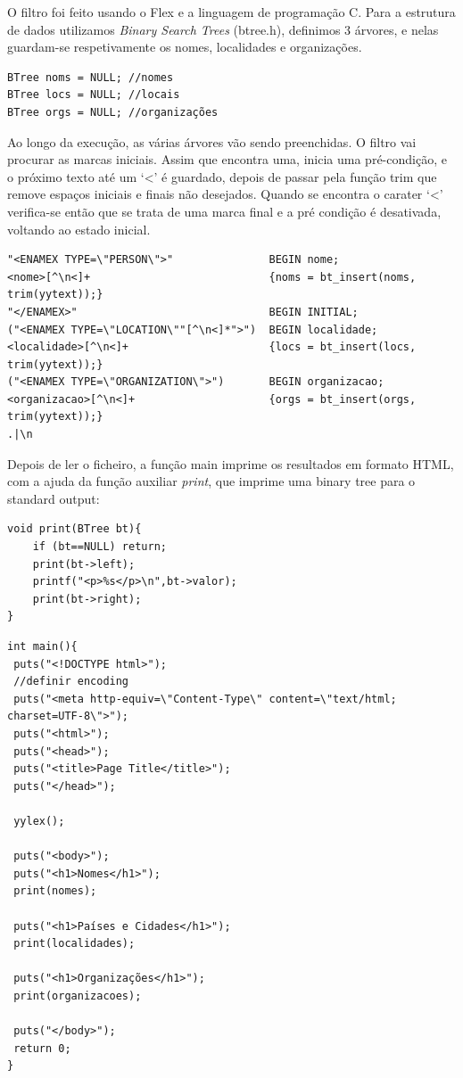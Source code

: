 \documentclass[11pt,a4paper]{article}
\begin{document}
O filtro foi feito usando o Flex e a linguagem de programação C. Para a estrutura de dados utilizamos \textit{Binary Search Trees} (btree.h), definimos 3 árvores, e nelas guardam-se respetivamente os nomes, localidades e organizações.

\begin{verbatim}
BTree noms = NULL; //nomes
BTree locs = NULL; //locais
BTree orgs = NULL; //organizações
\end{verbatim}

Ao longo da execução, as várias árvores vão sendo preenchidas. O filtro vai procurar as marcas iniciais. Assim que encontra uma, inicia uma pré-condição, e o próximo texto até um ‘<’ é guardado, depois de passar pela função trim que remove espaços iniciais e finais não desejados. Quando se encontra o carater ‘<’ verifica-se então que se trata de uma marca final e a pré condição é desativada, voltando ao estado inicial.

\begin{verbatim}
"<ENAMEX TYPE=\"PERSON\">"               BEGIN nome;
<nome>[^\n<]+                            {noms = bt_insert(noms, trim(yytext));}
"</ENAMEX>"                              BEGIN INITIAL;
("<ENAMEX TYPE=\"LOCATION\""[^\n<]*">")  BEGIN localidade;
<localidade>[^\n<]+                      {locs = bt_insert(locs, trim(yytext));}
("<ENAMEX TYPE=\"ORGANIZATION\">")       BEGIN organizacao;
<organizacao>[^\n<]+                     {orgs = bt_insert(orgs, trim(yytext));}
.|\n
\end{verbatim}

Depois de ler o ficheiro, a função main imprime os resultados em formato HTML, com a ajuda da função auxiliar \textit{print}, que imprime uma binary tree para o standard output:
\newpage
\begin{verbatim}
void print(BTree bt){
	if (bt==NULL) return;
	print(bt->left);
	printf("<p>%s</p>\n",bt->valor);
	print(bt->right);
}
\end{verbatim}

\begin{verbatim}
int main(){
 puts("<!DOCTYPE html>");
 //definir encoding
 puts("<meta http-equiv=\"Content-Type\" content=\"text/html; charset=UTF-8\">");
 puts("<html>");
 puts("<head>");
 puts("<title>Page Title</title>");
 puts("</head>");

 yylex();

 puts("<body>");
 puts("<h1>Nomes</h1>");
 print(nomes);

 puts("<h1>Países e Cidades</h1>");
 print(localidades);

 puts("<h1>Organizações</h1>");
 print(organizacoes);

 puts("</body>");
 return 0;
}
\end{verbatim}
\end{document}
